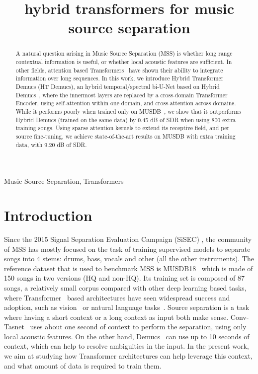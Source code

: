 \documentclass{article}
\title{hybrid transformers for music source separation}
\begin{document}
\maketitle
\begin{abstract}
A natural question arising in Music Source Separation (MSS) is whether long range contextual information is useful,
or whether local acoustic features are sufficient.
In other fields, attention based Transformers~\cite{transformer} have shown their ability to integrate
information over long sequences. In this work, we introduce Hybrid Transformer Demucs (HT Demucs), 
an hybrid temporal/spectral bi-U-Net based on Hybrid Demucs~\cite{defossez2021hybrid}, 
where the innermost layers are replaced by a cross-domain Transformer Encoder, 
using self-attention within one domain, and cross-attention across domains.
While it performs poorly when trained only on MUSDB~\cite{musdb}, we show that it outperforms Hybrid Demucs (trained on the same data) by 0.45 dB of SDR when using 800 extra training songs.
Using sparse attention kernels to extend its receptive field, and per source fine-tuning, 
we achieve state-of-the-art results on MUSDB with extra training data, with 9.20 dB of SDR.

\end{abstract}
\begin{keywords}
Music Source Separation, Transformers
\end{keywords}
\section{Introduction}
\label{sec:intro}

Since the 2015 Signal Separation Evaluation Campaign (SiSEC) \cite{sisec15}, the community of MSS has mostly focused on the task of training supervised models to separate songs into 4 stems: drums, bass, vocals and other (all the other instruments). The reference dataset that is used to benchmark MSS is MUSDB18~\cite{musdb,musdb18-hq} which is made of 150 songs in two versions (HQ and non-HQ). 
Its training set is composed of 87 songs, a relatively small corpus compared with other deep learning based tasks, where Transformer~\cite{transformer} based architectures have seen widespread success and adoption, such as vision~\cite{layerscale,Rombach_2022_CVPR} or natural language tasks~\cite{brown2020language}. Source separation is a task where having a short context or a long context as input both make sense. Conv-Tasnet~\cite{convtasnet} uses about one second of context to perform the separation, using only local acoustic features. On the other hand, Demucs~\cite{demucsv2} can use up to 10 seconds of context, which can help to resolve ambiguities in the input. In the present work, we aim at studying how Transformer architectures can help leverage this context, and what amount of data is required to train them.
\end{document}
